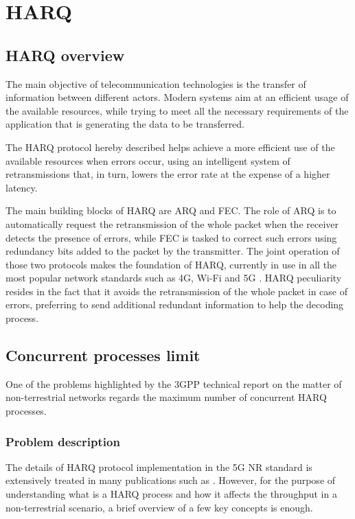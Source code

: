 
\chapter{HARQ}
\label{chp:harq}

\section{HARQ overview}
The main objective of telecommunication technologies is the transfer of information between different actors. Modern systems aim at an efficient usage of the available resources, while trying to meet all the necessary requirements of the application that is generating the data to be transferred. 

The \ac{HARQ} protocol hereby described helps achieve a more efficient use of the available resources when errors occur, using an intelligent system of retransmissions that, in turn, lowers the error rate at the expense of a higher latency.

The main building blocks of \ac{HARQ} are \ac{ARQ} and \ac{FEC}. The role of \ac{ARQ} is to automatically request the retransmission of the whole packet when the receiver detects the presence of errors, while \ac{FEC} is tasked to correct such errors using redundancy bits added to the packet by the transmitter. The joint operation of those two protocols makes the foundation of \ac{HARQ}, currently in use in all the most popular network standards such as 4G, Wi-Fi and 5G \cite{3gpp-38-series}. \ac{HARQ} peculiarity resides in the fact that it avoids the retransmission of the whole packet in case of errors, preferring to send additional redundant information to help the decoding process.

\section{Concurrent processes limit}
\label{sec:harq-conc-proc}

One of the problems highlighted by the \ac{3GPP} technical report \cite{3gpp-tr-38.811} on the matter of non-terrestrial networks regards the maximum number of concurrent \ac{HARQ} processes. 

\subsection{Problem description}
The details of \ac{HARQ} protocol implementation in the 5G \ac{NR} standard is extensively treated in many publications such as \cite{harq-wireless-communications-survey}. However, for the purpose of understanding what is a \ac{HARQ} process and how it affects the throughput in a non-terrestrial scenario, a brief overview of a few key concepts is enough.

